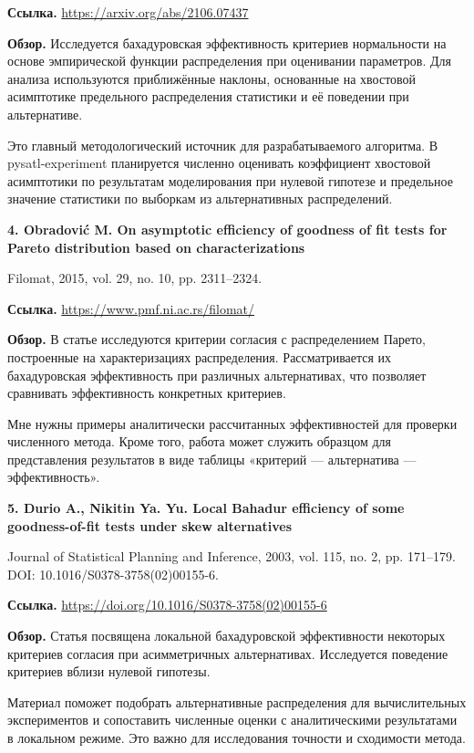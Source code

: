 \documentclass[12pt,a4paper]{article}
\begin{document}
\noindent\textbf{Ссылка.} \url{https://arxiv.org/abs/2106.07437}\par
\noindent\textbf{Обзор.} Исследуется бахадуровская эффективность критериев нормальности на основе эмпирической функции распределения при оценивании параметров. Для анализа используются приближённые наклоны, основанные на хвостовой асимптотике предельного распределения статистики и её поведении при альтернативе.\par
Это главный методологический источник для разрабатываемого алгоритма. В pysatl-experiment планируется численно оценивать коэффициент хвостовой асимптотики по результатам моделирования при нулевой гипотезе и предельное значение статистики по выборкам из альтернативных распределений.\par
\par\noindent\textbf{4. Obradović M. On asymptotic efficiency of goodness of fit tests for Pareto distribution based on characterizations}\par
Filomat, 2015, vol. 29, no. 10, pp. 2311–2324.\par
\noindent\textbf{Ссылка.} \url{https://www.pmf.ni.ac.rs/filomat/}\par
\noindent\textbf{Обзор.} В статье исследуются критерии согласия с распределением Парето, построенные на характеризациях распределения. Рассматривается их бахадуровская эффективность при различных альтернативах, что позволяет сравнивать эффективность конкретных критериев.\par
Мне нужны примеры аналитически рассчитанных эффективностей для проверки численного метода. Кроме того, работа может служить образцом для представления результатов в виде таблицы «критерий — альтернатива — эффективность».\par
\par\noindent\textbf{5. Durio A., Nikitin Ya. Yu. Local Bahadur efficiency of some goodness-of-fit tests under skew alternatives}\par
Journal of Statistical Planning and Inference, 2003, vol. 115, no. 2, pp. 171–179. DOI: 10.1016/S0378-3758(02)00155-6.\par
\noindent\textbf{Ссылка.} \url{https://doi.org/10.1016/S0378-3758(02)00155-6}\par
\noindent\textbf{Обзор.} Статья посвящена локальной бахадуровской эффективности некоторых критериев согласия при асимметричных альтернативах. Исследуется поведение критериев вблизи нулевой гипотезы.\par
Материал поможет подобрать альтернативные распределения для вычислительных экспериментов и сопоставить численные оценки с аналитическими результатами в локальном режиме. Это важно для исследования точности и сходимости метода.\par
\end{document}
